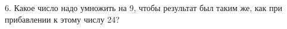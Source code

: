 6. Какое число надо умножить на 9, чтобы результат был таким же, как при прибавлении к этому числу 24?\\
